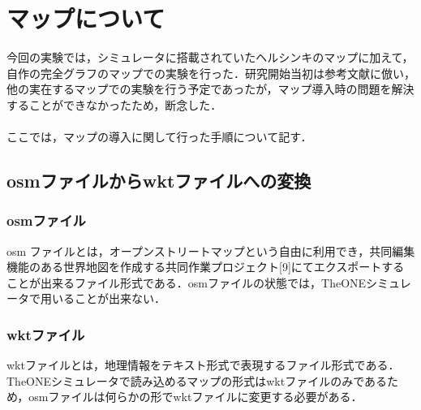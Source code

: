 \documentclass[11pt]{icsthesis}
\begin{document}
\clearpage
\nocite{*}

\fancyhead[L]{\nouppercase{\small\leftmark}}\fancyhead[R]{}
\renewcommand{\headrulewidth}{0.3truemm}


\clearpage
\fancyhead[L]{\nouppercase{\small\leftmark}}
\fancyhead[R]{\nouppercase{\small\rightmark}}
\fancyfoot[C]{--\ \thepage\ --}
\renewcommand{\headrulewidth}{0.3truemm}
\appendix
\chapter{マップについて}
今回の実験では，シミュレータに搭載されていたヘルシンキのマップに加えて，自作の完全グラフのマップでの実験を行った．研究開始当初は参考文献に倣い，他の実在するマップでの実験を行う予定であったが，マップ導入時の問題を解決することができなかったため，断念した．\\\\
ここでは，マップの導入に関して行った手順について記す．

\section{osmファイルからwktファイルへの変換}



\subsection{osmファイル}
osm ファイルとは，オープンストリートマップという自由に利用でき，共同編集機能のある世界地図を作成する共同作業プロジェクト[9]にてエクスポートすることが出来るファイル形式である．osmファイルの状態では，TheONEシミュレータで用いることが出来ない．
\subsection{wktファイル}
wktファイルとは，地理情報をテキスト形式で表現するファイル形式である．TheONEシミュレータで読み込めるマップの形式はwktファイルのみであるため，osmファイルは何らかの形でwktファイルに変更する必要がある．
\end{document}
